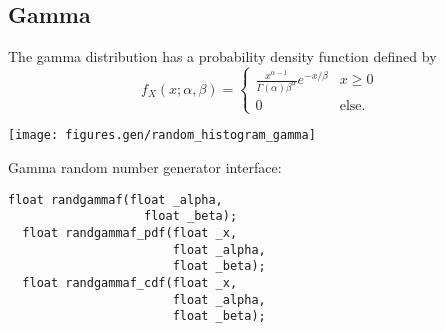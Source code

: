 % 
%
\subsection{Gamma}
\label{module:random:gamma}
The gamma distribution has a probability density function defined by
%
\begin{equation}
\label{eqn:random:gamma:pdf}
    f_X(x;\alpha,\beta) =
    \begin{cases}
        \frac{
            x^{\alpha-1}
        }{
            \Gamma(\alpha) \beta^\alpha
        }
        e^{-x / \beta}                  & x \ge 0 \\
        0                               & \text{else}.
    \end{cases}
\end{equation}
%


\begin{minipage}{0.5\textwidth}
  \texttt{[image: figures.gen/random\_histogram\_gamma]}
\end{minipage}
\begin{minipage}{0.5\textwidth}
  Gamma random number generator interface:
  \begin{Verbatim}[fontsize=\small]
  float randgammaf(float _alpha,
                   float _beta);
  float randgammaf_pdf(float _x,
                       float _alpha,
                       float _beta);
  float randgammaf_cdf(float _x,
                       float _alpha,
                       float _beta);
  \end{Verbatim}
\end{minipage}


% 
%
